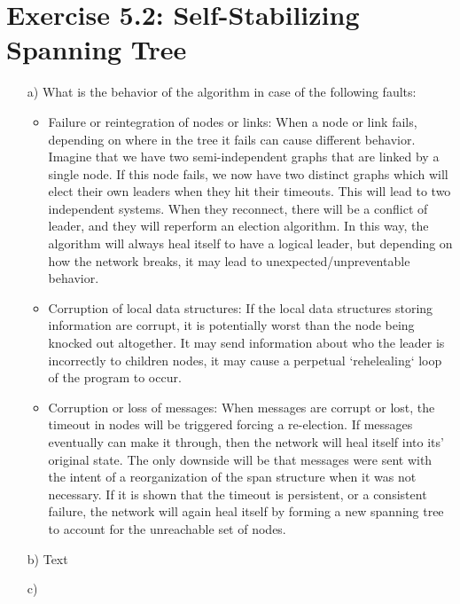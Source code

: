 \documentclass[12pt,a4paper]{article}
\begin{document}
\section*{Exercise 5.2: Self-Stabilizing Spanning Tree}
\begin{enumerate}

\item[a)] What is the behavior of the algorithm in case of the following faults:
  \begin{itemize}
  \item Failure or reintegration of nodes or links: When a node or link fails, depending on where in the tree it fails can cause different behavior. Imagine that we have two semi-independent graphs that are linked by a single node. If this node fails, we now have two distinct graphs which will elect their own leaders when they hit their timeouts. This will lead to two independent systems. When they reconnect, there will be a conflict of leader, and they will reperform an election algorithm. In this way, the algorithm will always heal itself to have a logical leader, but depending on how the network breaks, it may lead to unexpected/unpreventable behavior.
  \item Corruption of local data structures: If the local data structures storing information are corrupt, it is potentially worst than the node being knocked out altogether. It may send information about who the leader is incorrectly to children nodes, it may cause a perpetual `rehelealing` loop of the program to occur.
  \item Corruption or loss of messages: When messages are corrupt or lost, the timeout in nodes will be triggered forcing a re-election. If messages eventually can make it through, then the network will heal itself into its' original state. The only downside will be that messages were sent with the intent of a reorganization of the span structure when it was not necessary. If it is shown that the timeout is persistent, or a consistent failure, the network will again heal itself by forming a new spanning tree to account for the unreachable set of nodes.
  \end{itemize}
\item[b)] Text
\item[c)]
  \begin{enumerate}

\end{enumerate}
\end{enumerate}
\end{document}
